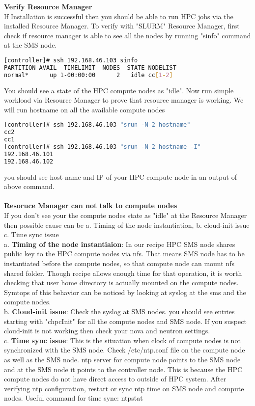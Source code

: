 \textbf{Verify Resource Manager}\\
If Installation is successful then you should be able to run HPC jobs via the installed Resource Manager. To verify with "SLURM" Resource Manager, first check if resource manager is able to see all the nodes by running "sinfo" command at the SMS node. 
\begin{lstlisting}[language=bash,keywords={},upquote=true]
[controller]# ssh 192.168.46.103 sinfo
PARTITION AVAIL  TIMELIMIT  NODES  STATE NODELIST
normal*      up 1-00:00:00      2   idle cc[1-2]
\end{lstlisting}
You should see a state of the HPC compute nodes as "idle". Now run simple workload via Resource Manager to prove that resource manager is working. We will run hostname on all the available compute nodes
\begin{lstlisting}[language=bash,keywords={},upquote=true]
[controller]# ssh 192.168.46.103 "srun -N 2 hostname"
cc2
cc1
[controller]# ssh 192.168.46.103 "srun -N 2 hostname -I"
192.168.46.101 
192.168.46.102
\end{lstlisting}
you should see host name and IP of your HPC compute node in an output of above command. \\
\\
\textbf{Resoruce Manager can not talk to compute nodes}\\
If you don't see your the compute nodes state as "idle" at the Resource Manager then possible cause can be a. Timing of the node instantiation, b. cloud-init issue c. Time sync issue \\
a. \textbf{Timing of the node instantiaion}: In our recipe HPC SMS node shares public key to the HPC compute nodes via nfs. That means SMS node has to be instantiated before the compute nodes, so that compute node can mount nfs shared folder. Though recipe allows enough time for that operation, it is worth checking that user home directory is actually mounted on the compute nodes. Symtops of this behavior can be noticed by looking at syslog at the sms and the compute nodes.    \\
b. \textbf{Cloud-init issue}: Check the syslog at SMS nodes. you should see entries starting with "chpcInit" for all the compute nodes and SMS node. If you suspect cloud-init is not working then check your nova and neutron settings.\\
c. \textbf{Time sync issue}: This is the situation when clock of compute nodes is not synchronized with the SMS node. Check /etc/ntp.conf file on the compute node as well as the SMS node. ntp server for compute node points to the SMS node and at the SMS node it points to the controller node. This is because the HPC compute nodes do not have direct access to outside of HPC system. After verifying ntp configuration, restart or sync ntp time on SMS node and compute nodes. Useful command for time sync: ntpstat\\


	
